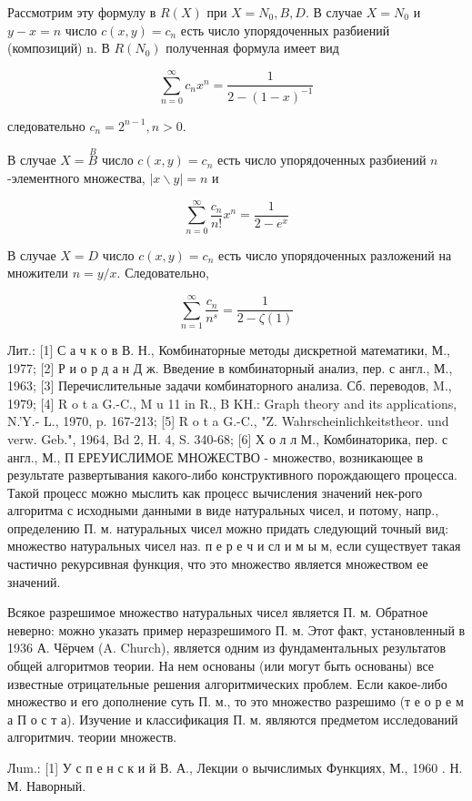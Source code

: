 \documentclass[10pt]{article}
\begin{document}
Рассмотрим эту формулу в $R(X)$ при $X=N_{0}, B, D$. В случае $X=N_{0}$ и $y-x=n$ число $c(x, y)=c_{n}$ есть число упорядоченных разбиений (композиций) n. В $R\left(N_{0}\right)$ полученная формула имеет вид

\[
\sum_{n=0}^{\infty} c_{n} x^{n}=\frac{1}{2-(1-x)^{-1}}
\]

следовательно $c_{n}=2^{n-1}, n>0$.

В случае $X=\stackrel{B}{B}$ число $c(x, y)=c_{n}$ есть число упорядоченных разбиений $n$-элементного множества, $|x \backslash y|=n$ и

\[
\sum_{n=0}^{\infty} \frac{c_{n}}{n !} x^{n}=\frac{1}{2-e^{x}}
\]

В случае $X=D$ число $c(x, y)=c_{n}$ есть число упорядоченных разложений на множители $n=y / x$. Следовательно,

\[
\sum_{n=1}^{\infty} \frac{c_{n}}{n^{s}}=\frac{1}{2-\zeta(1)}
\]

Лит.: [1] С а ч к о в В. Н., Комбинаторные методы дискретной математики, М., 1977; [2] Р и о р д а н Д ж. Введение в комбинаторный анализ, пер. с англ., М., 1963; [3] Перечислительные задачи комбинаторного анализа. Сб. переводов, M., 1979; [4] R o t a G.-C., M u 11 in R., B KH.: Graph theory and its
applications, N.'Y.- L., 1970, p. 167-213; [5] R o t a G.-C., "Z. Wahrscheinlichkeitstheor. und verw. Geb.", 1964, Bd 2, H. 4, S. 340-68; [6] Х о л л М., Комбинаторика, пер. с англ., М., П ЕРЕУИСЛИМОЕ МНОЖЕСТВО - множество, возникающее в результате развертывания какого-либо конструктивного порождающего процесса. Такой процесс можно мыслить как процесс вычисления значений нек-рого алгоритма с исходными данными в виде натуральных чисел, и потому, напр., определению П. м. натуральных чисел можно придать следующий точный вид: множество натуральных чисел наз. п е р е ч и сл и м ы м, если существует такая частично рекурсивная функция, что это множество является множеством ее значений.

Всякое разрешимое множество натуральных чисел является П. м. Обратное неверно: можно указать пример неразрешимого П. м. Этот факт, установленный в 1936 А. Чёрчем (A. Church), является одним из фундаментальных результатов общей алгоритмов теории. На нем основаны (или могут быть основаны) все известные отрицательные решения алгоритмических проблем. Если какое-либо множество и его дополнение суть П. м., то это множество разрешимо (т е о р е м а П о с т а). Изучение и классификация П. м. являются предметом исследований алгоритмич. теории множеств.

Лum.: [1] У с п е н с к и й В. А., Лекции о вычислимых Функциях, М., 1960 . Н. М. Наворный.
\end{document}
